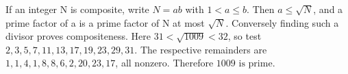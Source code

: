 If an integer N is composite, write $N=ab$ with $1<a\le b$. Then $a\le\sqrt N$, and a prime factor of a is a prime factor of N at most $\sqrt N$. Conversely finding such a divisor proves compositeness. Here $31<\sqrt{1009}<32$, so test $2,3,5,7,11,13,17,19,23,29,31$. The respective remainders are $1,1,4,1,8,8,6,2,20,23,17$, all nonzero. Therefore $\boxed{1009\text{ is prime}}$.
